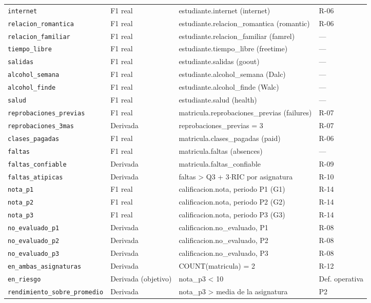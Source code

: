 \begin{tabular}{p{3.9cm}p{2.0cm}p{6.8cm}p{2.2cm}}
\texttt{internet} & F1 real & estudiante.internet (internet) & R-06 \\
\texttt{relacion\_romantica} & F1 real & estudiante.relacion\_romantica (romantic) & R-06 \\
\texttt{relacion\_familiar} & F1 real & estudiante.relacion\_familiar (famrel) & — \\
\texttt{tiempo\_libre} & F1 real & estudiante.tiempo\_libre (freetime) & — \\
\texttt{salidas} & F1 real & estudiante.salidas (goout) & — \\
\texttt{alcohol\_semana} & F1 real & estudiante.alcohol\_semana (Dalc) & — \\
\texttt{alcohol\_finde} & F1 real & estudiante.alcohol\_finde (Walc) & — \\
\texttt{salud} & F1 real & estudiante.salud (health) & — \\
\texttt{reprobaciones\_previas} & F1 real & matricula.reprobaciones\_previas (failures) & R-07 \\
\texttt{reprobaciones\_3mas} & Derivada & reprobaciones\_previas = 3 & R-07 \\
\texttt{clases\_pagadas} & F1 real & matricula.clases\_pagadas (paid) & R-06 \\
\texttt{faltas} & F1 real & matricula.faltas (absences) & — \\
\texttt{faltas\_confiable} & Derivada & matricula.faltas\_confiable & R-09 \\
\texttt{faltas\_atipicas} & Derivada & faltas > Q3 + 3$\cdot$RIC por asignatura & R-10 \\
\texttt{nota\_p1} & F1 real & calificacion.nota, periodo P1 (G1) & R-14 \\
\texttt{nota\_p2} & F1 real & calificacion.nota, periodo P2 (G2) & R-14 \\
\texttt{nota\_p3} & F1 real & calificacion.nota, periodo P3 (G3) & R-14 \\
\texttt{no\_evaluado\_p1} & Derivada & calificacion.no\_evaluado, P1 & R-08 \\
\texttt{no\_evaluado\_p2} & Derivada & calificacion.no\_evaluado, P2 & R-08 \\
\texttt{no\_evaluado\_p3} & Derivada & calificacion.no\_evaluado, P3 & R-08 \\
\texttt{en\_ambas\_asignaturas} & Derivada & COUNT(matricula) = 2 & R-12 \\
\texttt{en\_riesgo} & Derivada (objetivo) & nota\_p3 < 10 & Def. operativa \\
\texttt{rendimiento\_sobre\_promedio} & Derivada & nota\_p3 > media de la asignatura & P2 \\

\end{tabular}
